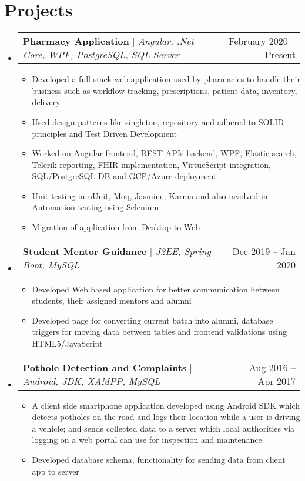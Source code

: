 \documentclass[letterpaper,11pt]{article}
\makeatletter
\newcommand{\resumeItem}[1]{
  \item\small{
    {#1 \vspace{-2pt}}
  }
}
\newcommand{\resumeProjectHeading}[2]{
    \item
    \begin{tabular*}{0.97\textwidth}{l@{\extracolsep{\fill}}r}
      \small#1 & #2 \\
    \end{tabular*}\vspace{-7pt}
}
\newcommand{\resumeSubHeadingListStart}{\begin{itemize}[leftmargin=0.15in, label={}]}
\newcommand{\resumeSubHeadingListEnd}{\end{itemize}}
\newcommand{\resumeItemListStart}{\begin{itemize}}
\newcommand{\resumeItemListEnd}{\end{itemize}\vspace{-5pt}}
\makeatother
\begin{document}
\section{Projects}
    \resumeSubHeadingListStart
      \resumeProjectHeading
          {\textbf{Pharmacy Application} $|$ \emph{Angular, .Net Core, WPF, PostgreSQL, SQL Server}}{February 2020 -- Present}
          \resumeItemListStart  
          \resumeItem{Developed a full-stack web application used by pharmacies to handle their business such as workflow tracking, prescriptions, patient data, inventory, delivery}
            \resumeItem{Used design patterns like singleton, repository and adhered to SOLID principles and Test Driven Development}
            \resumeItem{Worked on Angular frontend, REST APIs backend, WPF, Elastic search, Telerik reporting, FHIR implementation, VirtueScript integration, SQL/PostgreSQL DB and GCP/Azure deployment}
            \resumeItem{Unit testing in nUnit, Moq, Jasmine, Karma and also involved in Automation testing using Selenium}
            \resumeItem{Migration of application from Desktop to Web}
          \resumeItemListEnd
      \resumeProjectHeading
          {\textbf{Student Mentor Guidance} $|$ \emph{J2EE, Spring Boot, MySQL}}{Dec 2019 -- Jan 2020}
          \resumeItemListStart
            \resumeItem{Developed Web based application for better communication between students, their assigned mentors and alumni}
            \resumeItem{Developed page for converting current batch into alumni, database triggers for moving data between tables and frontend validations using HTML5/JavaScript}
          \resumeItemListEnd
      \resumeProjectHeading
          {\textbf{Pothole Detection and Complaints} $|$ \emph{Android, JDK, XAMPP, MySQL}}{Aug 2016 -- Apr 2017}
          \resumeItemListStart
            \resumeItem{A client side smartphone application developed using Android SDK which detects potholes on the road and logs their location while a user is driving a vehicle; and sends collected data to a server which local authorities via logging on a web portal can use for inspection and maintenance}
            \resumeItem{Developed database schema, functionality for sending data from client app to server}
          \resumeItemListEnd
    \resumeSubHeadingListEnd



%
\end{document}
